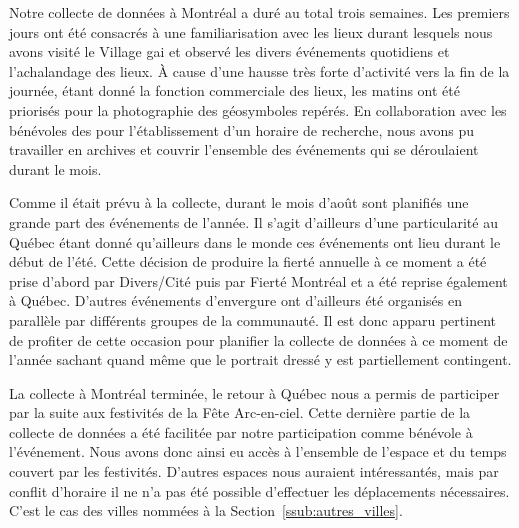 Notre collecte de données à Montréal a duré au total trois semaines. 
Les premiers jours ont été consacrés à une familiarisation avec les lieux durant lesquels nous avons visité le Village gai et observé les divers événements quotidiens et l'achalandage des lieux. 
À cause d'une hausse très forte d'activité vers la fin de la journée, étant donné la fonction commerciale des lieux, les matins ont été priorisés pour la photographie des géosymboles repérés. 
En collaboration avec les bénévoles des \agq{} pour l'établissement d'un horaire de recherche, nous avons pu travailler en archives et couvrir l'ensemble des événements \lgbt{} qui se déroulaient durant le mois. 

Comme il était prévu à la collecte, durant le mois d'août sont planifiés une grande part des événements \lgbt{} de l'année. 
Il s'agit d'ailleurs d'une particularité au Québec étant donné qu'ailleurs dans le monde ces événements ont lieu durant le début de l'été. 
Cette décision de produire la fierté annuelle à ce moment a été prise d'abord par Divers/Cité puis par Fierté Montréal et a été reprise également à Québec. 
D'autres événements d'envergure ont d'ailleurs été organisés en parallèle par différents groupes de la communauté. 
Il est donc apparu pertinent de profiter de cette occasion pour planifier la collecte de données à ce moment de l'année sachant quand même que le portrait dressé y est partiellement contingent. 

La collecte à Montréal terminée, le retour à Québec nous a permis de participer par la suite aux festivités de la Fête Arc-en-ciel. 
Cette dernière partie de la collecte de données a été facilitée par notre participation comme bénévole à l'événement. 
Nous avons donc ainsi eu accès à l'ensemble de l'espace et du temps couvert par les festivités. 
D'autres espaces nous auraient intéressantés, mais par conflit d'horaire il ne n'a pas été possible d'effectuer les déplacements nécessaires. 
C'est le cas des villes nommées à la Section~\ref{ssub:autres_villes}.



